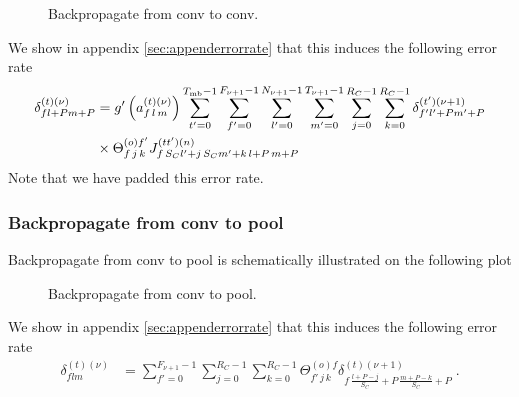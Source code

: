 \begin{figure}[H]
\begin{center}
\caption{Backpropagate from conv to conv.}
\end{center}
\end{figure}
We show in appendix \ref{sec:appenderrorrate} that this induces the following error rate
\begin{align}
\delta^{(t)(\nu)}_{fl+Pm+P}&=g'\left(a_{f\,l\,m}^{(t)(\nu)}\right)
%
\sum_{t'=0}^{T_{{\rm mb}}-1}\sum^{F_{\nu+1}-1}_{f'=0}\sum^{N_{\nu+1}-1}_{l'=0}\sum^{T_{\nu+1}-1}_{m'=0}
%
\sum^{R_C-1}_{j=0}\sum^{R_C-1}_{k=0}\delta_{f'l'+Pm'+P}^{(t')(\nu+1)}\notag\\
%
&\times\Theta^{(o)f'}_{f\,j\,k}J^{(tt')(n)}_{f\, S_Cl'+j\,S_Cm'+k\,l+P\,m+P}
\end{align}
Note that we have padded this error rate.

\subsubsection{Backpropagate from conv to pool}

Backpropagate from conv to pool is schematically illustrated on the following plot

\begin{figure}[H]
\begin{center}
\caption{Backpropagate from conv to pool.}
\end{center}
\end{figure}
We show in appendix \ref{sec:appenderrorrate} that this induces the following error rate
\begin{align}
\delta^{(t)(\nu)}_{flm}&=
%
\sum^{F_{\nu+1}-1}_{f'=0}\sum^{R_C-1}_{j=0}\sum^{R_C-1}_{k=0}
%
\Theta^{(o)f}_{f'\,j\,k}\delta_{f\,\frac{l+P-j}{S_C}+P\,\frac{m+P-k}{S_C}+P}^{(t)(\nu+1)}\;.
\end{align}

